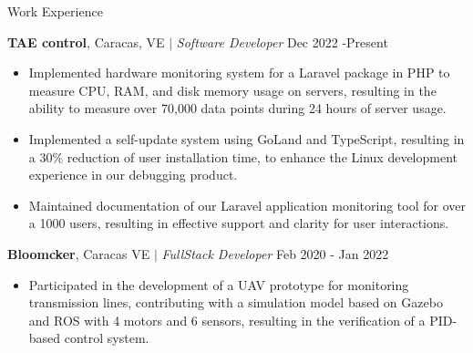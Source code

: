 \documentclass{resume} %
\begin{document}
    \begin{rSection}{Work Experience} %
    
    \textbf{TAE control}, Caracas, VE $\mid$ \textit{Software Developer} \hfill Dec 2022 -Present
    
    \begin{itemize}
        \item Implemented hardware monitoring system for a Laravel package in PHP to measure CPU, RAM, and disk memory usage on servers, resulting in the ability to measure over 70,000 data points during 24 hours of server usage.
        
        \item Implemented a self-update system using GoLand and TypeScript, resulting in a 30\% reduction of user installation time, to enhance the Linux development experience in our debugging product.
        
        \item Maintained documentation of our Laravel application monitoring tool for over a 1000 users, resulting in effective support and clarity for user interactions.
    
            
            
    \end{itemize}


    \textbf{Bloomcker}, Caracas VE $\mid$ \textit{FullStack Developer} \hfill Feb 2020 - Jan 2022
    
    \begin{itemize}
        \item Participated in the development of a UAV prototype for monitoring transmission lines, contributing with a simulation model based on Gazebo and ROS with 4 motors and 6 sensors, resulting in the verification of a PID-based control system.
        

\end{itemize}
\end{rSection}
\end{document}
